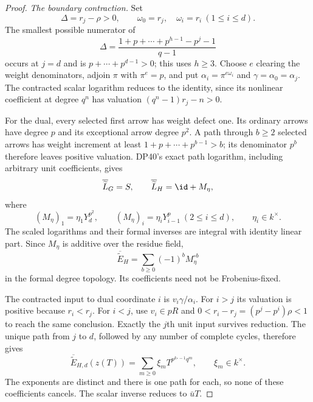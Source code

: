 \begin{proof}
\emph{The boundary contraction.}
Set
\[
 \Delta=r_j-\rho>0,\qquad
 \omega_0=r_j,\quad\omega_i=r_i\ (1\le i\le d).
\]
The smallest possible numerator of
\[
 \Delta=\frac{1+p+\cdots+p^{h-1}-p^j-1}{q-1}
\]
occurs at $j=d$ and is $p+\cdots+p^{d-1}>0$; this uses $h\ge3$.
Choose $e$ clearing the weight denominators, adjoin $\pi$ with $\pi^e=p$, and put
$\alpha_i=\pi^{e\omega_i}$ and $\gamma=\alpha_0=\alpha_j$.
The contracted scalar logarithm reduces to the identity, since its nonlinear coefficient at degree $q^n$ has valuation
$(q^n-1)r_j-n>0$.

For the dual, every selected first arrow has weight defect one. Its ordinary arrows have degree $p$ and its exceptional arrow degree $p^2$.
A path through $b\ge2$ selected arrows has weight increment at least
$1+p+\cdots+p^{b-1}>b$; its denominator $p^b$ therefore leaves positive valuation.
DP40's exact path logarithm, including arbitrary unit coefficients, gives
\begin{equation}\label{eq:nonunitreducedlog}
 \overline{\widetilde L}_G=S,\qquad
 \overline{\widetilde L}_H=\id+M_\eta,
\end{equation}
where
\[
 (M_\eta)_1=\eta_1Y_d^{p^2},\qquad
 (M_\eta)_i=\eta_iY_{i-1}^p\ (2\le i\le d),
 \qquad\eta_i\in k^\times.
\]
The scaled logarithms and their formal inverses are integral with identity linear part. Since $M_\eta$ is additive over the residue field,
\[
 \overline{\widetilde E}_H
       =\sum_{b\ge0}(-1)^bM_\eta^{\circ b}
\]
in the formal degree topology. Its coefficients need not be Frobenius-fixed.

The contracted input to dual coordinate $i$ is $v_i\gamma/\alpha_i$.
For $i>j$ its valuation is positive because $r_i<r_j$.
For $i<j$, use $v_i\in pR$ and
$0<r_i-r_j=(p^j-p^i)\rho<1$ to reach the same conclusion.
Exactly the $j$th unit input survives reduction.
The unique path from $j$ to $d$, followed by any number of complete cycles, therefore gives
\begin{equation}\label{eq:nonunitinversecycle}
 \overline{\widetilde E}_{H,d}(z(T))
       =\sum_{m\ge0}\xi_mT^{p^{k_*-1}q^m},
       \qquad\xi_m\in k^\times.
\end{equation}
The exponents are distinct and there is one path for each, so none of these coefficients cancels. The scalar inverse reduces to $\bar uT$.


\end{proof}
